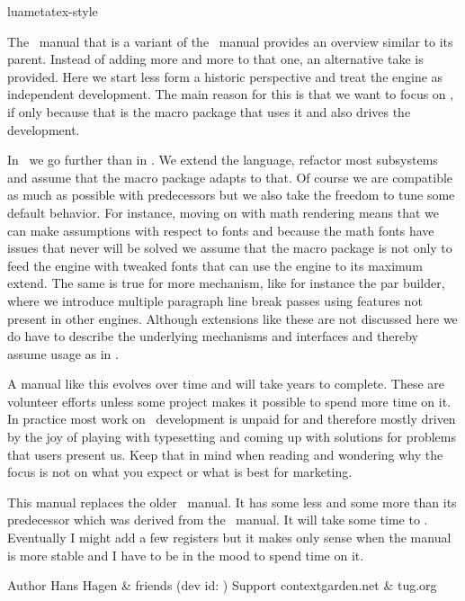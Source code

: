 
\environment luametatex-style

\startdocument[title=Introduction]

The \LUAMETATEX\ manual that is a variant of the \LUATEX\ manual provides an
overview similar to its parent. Instead of adding more and more to that one, an
alternative take is provided. Here we start less form a historic perspective and
treat the engine as independent development. The main reason for this is that we
want to focus on \CONTEXT, if only because that is the macro package that uses it
and also drives the development.

In \LUAMETATEX\ we go further than in \LUATEX. We extend the language, refactor
most subsystems and assume that the macro package adapts to that. Of course we
are compatible as much as possible with predecessors but we also take the freedom
to tune some default behavior. For instance, moving on with math rendering means
that we can make assumptions with respect to fonts and because the math fonts
have issues that never will be solved we assume that the macro package is not
only to feed the engine with tweaked fonts that can use the engine to its maximum
extend. The same is true for more mechanism, like for instance the par builder,
where we introduce multiple paragraph line break passes using features not
present in other engines. Although extensions like these are not discussed here we
do have to describe the underlying mechanisms and interfaces and thereby assume
usage as in \CONTEXT.

A manual like this evolves over time and will take years to complete. These are
volunteer efforts unless some project makes it possible to spend more time on it.
In practice most work on \TEX\ development is unpaid for and therefore mostly
driven by the joy of playing with typesetting and coming up with solutions for
problems that users present us. Keep that in mind when reading and wondering why
the focus is not on what you expect or what is best for marketing.

This manual replaces the older \LUAMETATEX\ manual. It has some less and some
more than its predecessor which was derived from the \LUATEX\ manual. It will
take some time to . Eventually I might add a few registers but
it makes only sense when the manual is more stable and I have to be in the mood
to spend time on it.

\starttabulate[|||]
    \NC Author      \NC Hans Hagen & friends        \NC \NR
    \NC \CONTEXT    \NC \contextversion             \NC \NR
    \NC \LUAMETATEX \NC \luametatexverboseversion   %
                        \space (dev id: \luametatexfunctionality)  \NC \NR
    \NC Support     \NC contextgarden.net & tug.org \NC \NR
\stoptabulate

\stopdocument
